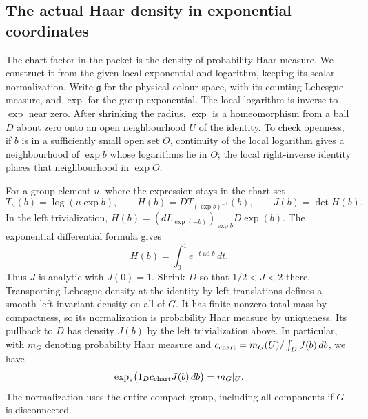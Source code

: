 \subsection{The actual Haar density in exponential coordinates}
\label{sec:haar-chart}
The chart factor in the packet is the density of probability Haar
measure. We construct it from the given local exponential and logarithm,
keeping its scalar normalization. Write $\mathfrak g$ for the physical
colour space, with its counting Lebesgue measure, and $\exp$ for the
group exponential. The local logarithm is inverse to $\exp$ near zero.
After shrinking the radius, $\exp$ is a homeomorphism from a ball
$D$ about zero onto an open neighbourhood $U$ of the identity. To
check openness, if $b$ is in a sufficiently small open set $O$, continuity
of the local logarithm gives a neighbourhood of $\exp b$ whose
logarithms lie in $O$; the local right-inverse identity places that
neighbourhood in $\exp O$.

For a group element $u$, where the expression stays in the chart set
\[
 T_u(b)=\log(u\exp b),\qquad
 H(b)=D T_{(\exp b)^{-1}}(b),\qquad J(b)=\det H(b).
\]
In the left trivialization, $H(b)=(dL_{\exp(-b)})_{\exp b}
D\exp(b)$. The exponential differential formula
\cite[Theorem~1.5.3, Eq.~(1.5.1)]{DuistermaatKolk} gives
\[
 H(b)=\int_0^1 e^{-t\operatorname{ad}b}\,dt .
\]
Thus $J$ is analytic with $J(0)=1$. Shrink $D$ so that $1/2<J<2$
there. Transporting Lebesgue density at the identity by left
translations defines a smooth left-invariant density on all of $G$.
It has finite nonzero total mass by compactness, so its normalization
is probability Haar measure by uniqueness. Its pullback to $D$ has
density $J(b)$ by the left trivialization above. In particular, with
$m_G$ denoting probability Haar measure and
$c_{\rm chart}=m_G(U)/\int_D J(b)\,db$, we have
\begin{equation}\label{eq:haar-chart-measure}
 \exp_*\bigl(1_D c_{\rm chart}J(b)\,db\bigr)=m_G|_U.
\end{equation}
The normalization uses the entire compact group, including all
components if $G$ is disconnected.


